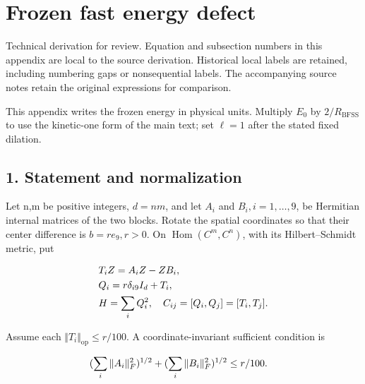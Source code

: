 \clearpage
\section{Frozen fast energy defect}\label{b-frozen-fast-energy-defect}

Technical derivation for review. Equation and subsection numbers in this
appendix are local to the source derivation. Historical local labels are
retained, including numbering gaps or nonsequential labels. The
accompanying source notes retain the original expressions for
comparison.

This appendix writes the frozen energy in physical units. Multiply
\(E_{0}\) by \(2/R_{\mathrm{BFSS}}\) to use the kinetic-one form of the
main text; set \(\ell =1\) after the stated fixed dilation.

\subsection{1. Statement and
normalization}\label{b-statement-and-normalization}

Let n,m be positive integers, \(d=nm\), and let \(A_{i}\) and
\(B_{i}, i=1,\ldots ,9\), be Hermitian internal matrices of the two
blocks. Rotate the spatial coordinates so that their center difference
is \(b=r e_{9}, r>0\). On \(\operatorname{Hom} (C^{m},C^{n})\), with its
Hilbert--Schmidt metric, put

\begin{gather*}
\begin{aligned}
& T_{i} Z=A_{i} Z-Z B_{i}, \\
& Q_{i}=r \delta _{i9} I_{d}+T_{i}, \\
& H=\sum _{i} Q_{i}^{2}, \quad  C_{ij}=[Q_{i},Q_{j}]=[T_{i},T_{j}].
\end{aligned}\notag
\end{gather*}

Assume each \(\Vert T_{i}\Vert _{\mathrm{op}}\le r/100\). A
coordinate-invariant sufficient condition is

\begin{gather*}
\begin{aligned}
& (\sum _{i} \Vert A_{i}\Vert _{F}^{2})^{1/2}+(\sum _{i} \Vert B_{i}\Vert _{F}^{2})^{1/2}\le r/100.
\end{aligned}\notag
\end{gather*}

